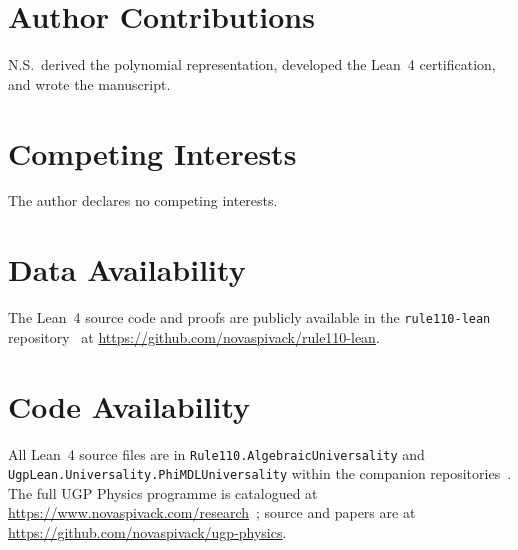 \documentclass[11pt]{article}
\theoremstyle{remark}
\newcommand{\lean}[1]{%
  \penalty-100
  \begingroup\def\_{\textunderscore\allowbreak}\texttt{#1}\endgroup}
\begin{document}
\section*{Author Contributions}
N.S.\ derived the polynomial representation, developed the Lean~4 certification,
and wrote the manuscript.

\section*{Competing Interests}
The author declares no competing interests.

\section*{Data Availability}
The Lean~4 source code and proofs are publicly available in the
\texttt{rule110-lean} repository~\cite{rule110-lean} at
\url{https://github.com/novaspivack/rule110-lean}.

\section*{Code Availability}
All Lean~4 source files are in \lean{Rule110.\allowbreak{}AlgebraicUniversality}
and \lean{UgpLean.Universality.\allowbreak{}PhiMDLUniversality} within the companion
repositories~\cite{rule110-lean}.
The full UGP Physics programme is catalogued at \url{https://www.novaspivack.com/research}~\cite{SpivackResearchProgrammes}; source and papers are at \url{https://github.com/novaspivack/ugp-physics}.



\end{document}
